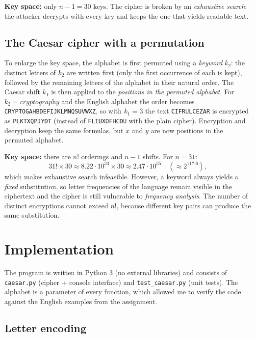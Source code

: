 \documentclass[12pt,a4paper]{article}
\newcommand{\code}[1]{\texttt{\small #1}}
\begin{document}
\textbf{Key space:} only $n-1 = 30$ keys. The cipher is broken by an
\emph{exhaustive search}: the attacker decrypts with every key and keeps the one
that yields readable text.

\subsection{The Caesar cipher with a permutation}

To enlarge the key space, the alphabet is first permuted using a \emph{keyword}
$k_2$: the distinct letters of $k_2$ are written first (only the first occurrence of
each is kept), followed by the remaining letters of the alphabet in their natural
order. The Caesar shift $k_1$ is then applied to the \emph{positions in the permuted
alphabet}. For $k_2 = \textit{cryptography}$ and the English alphabet the order becomes
\texttt{CRYPTOGAHBDEFIJKLMNQSUVWXZ}, so with $k_1 = 3$ the text \texttt{CIFRULCEZAR}
is encrypted as \texttt{PLKTXQPJYDT} (instead of \texttt{FLIUXOFHCDU} with the plain
cipher). Encryption and decryption keep the same formulas, but $x$ and $y$ are now
positions in the permuted alphabet.

\textbf{Key space:} there are $n!$ orderings and $n-1$ shifts. For $n = 31$:
\[
  31! \times 30 \approx 8.22\cdot 10^{33} \times 30 \approx 2.47\cdot 10^{35}
  \quad (\approx 2^{117.6}),
\]
which makes exhaustive search infeasible. However, a keyword always yields a
\emph{fixed} substitution, so letter frequencies of the language remain visible in
the ciphertext and the cipher is still vulnerable to \emph{frequency analysis}. The
number of distinct encryptions cannot exceed $n!$, because different key pairs can
produce the same substitution.

\section{Implementation}

The program is written in Python 3 (no external libraries) and consists of
\code{caesar.py} (cipher + console interface) and \code{test\_caesar.py} (unit
tests). The alphabet is a parameter of every function, which allowed me to verify the
code against the English examples from the assignment.

\subsection{Letter encoding}
\end{document}
